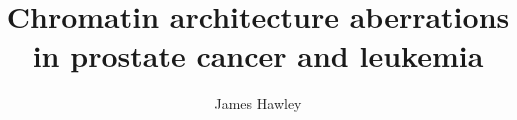\documentclass[oneside,doublespacing]{ut-thesis}
\author{James Hawley}
\title{Chromatin architecture aberrations in prostate cancer and leukemia}
\begin{document}
\frontmatter

% 
% 

% 
% 

\mainmatter
% 





% 

% 

% 


\backmatter
\printunsrtglossaries

\end{document}
